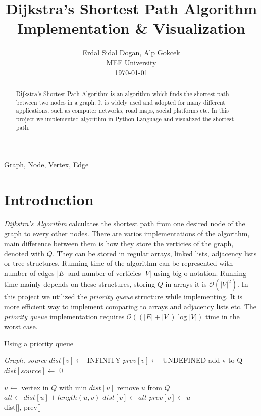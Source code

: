 \documentclass[twocolumns]{IEEEtran}
\author{Erdal Sidal Dogan, Alp Gokcek \\ MEF University \\ \today}
\title{Dijkstra's Shortest Path Algorithm Implementation \& Visualization}
\begin{document}
	\maketitle
	\begin{abstract}
		Dijkstra's Shortest Path Algorithm is an algorithm which finds the shortest path between two nodes in a graph. It is widely used and adopted for many different applications, such as computer networks, road maps, social platforms etc. In this project we implemented algorithm in Python Language and visualized the shortest path.
	\end{abstract}
	\begin{IEEEkeywords}
		Graph, Node, Vertex, Edge
	\end{IEEEkeywords}
	\section{Introduction}
	\textit{Dijkstra's Algorithm} calculates the shortest path from one desired node of the graph to every other nodes. There are varios implementations of the algorithm, main difference between them is how they store the verticies of the graph, denoted with $Q$. They can be stored in regular arrays, linked lists, adjacency lists or tree structures. Running time of the algorithm can be represented with number of edges $|E|$ and number of verticies $|V|$ using big-o notation. Running time mainly depends on these structures, storing $Q$ in arrays it is $\mathcal{O}(|V|^2)$. In this project we utilized the \textit{priority queue} structure while implementing. It is more efficient way to implement comparing to arrays and adjacency lists etc. The \textit{priority queue} implementation requires $\mathcal{O}((|E| + |V|) \log{|V|})$ time in the worst case. 
	\begin{algorithm}
		\caption{Using a priority queue}
		\begin{algorithmic}[1]
			 {\textit{Graph, source}}
					\State $dist[v] \leftarrow$ INFINITY                  
					\State $prev[v] \leftarrow$ UNDEFINED
					\State add v to Q                      
				\EndFor
				\State $dist[source] \leftarrow$ 0
	
					\State $u \leftarrow$ vertex in $Q$ with min $dist[u]$
					\State remove $u$ from $Q$
						\State $alt \leftarrow dist[u] + length(u, v)$
							\State $dist[v] \leftarrow alt$
							\State $prev[v] \leftarrow u$
						\EndIf
					\EndFor
				\EndWhile \\
				\Return dist[], prev[]
			\EndFunction
		\end{algorithmic}
	\end{algorithm}
		
\end{document}
